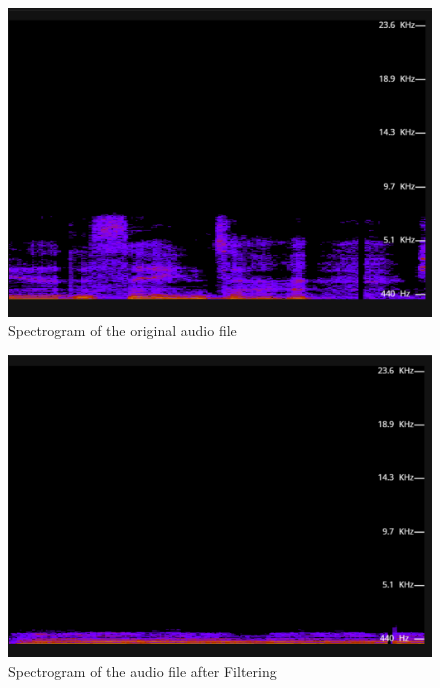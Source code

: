 \documentclass[journal,12pt,twocolumn]{IEEEtran}
\theoremstyle{remark}
\begin{document}
\begin{enumerate}[label=\thesection.\arabic*
,ref=\thesection.\theenumi]
\begin{figure}[H]
    \includegraphics[width=0.8\columnwidth]{figs/Original_sound.png}
    \caption{Spectrogram of the original audio file}
    \label{fig:original_sound__plot}
\end{figure}
\begin{figure}[H]
\includegraphics[width=0.8\columnwidth]{figs/Reduced_sound.png}
    \caption{Spectrogram of the audio file after Filtering}
    \label{fig:Reduced_noise_plot}
\end{figure}

\end{enumerate}
\end{document}
